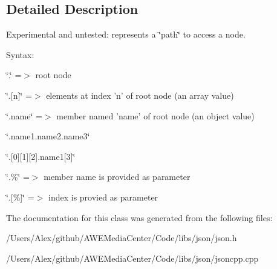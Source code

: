\subsection{Detailed Description}
Experimental and untested\-: represents a \char`\"{}path\char`\"{} to access a node. 

Syntax\-:
\begin{DoxyItemize}
\item \char`\"{}.\char`\"{} =$>$ root node
\item \char`\"{}.\mbox{[}n\mbox{]}\char`\"{} =$>$ elements at index 'n' of root node (an array value)
\item \char`\"{}.\-name\char`\"{} =$>$ member named 'name' of root node (an object value)
\item \char`\"{}.\-name1.\-name2.\-name3\char`\"{}
\item \char`\"{}.\mbox{[}0\mbox{]}\mbox{[}1\mbox{]}\mbox{[}2\mbox{]}.\-name1\mbox{[}3\mbox{]}\char`\"{}
\item \char`\"{}.\%\char`\"{} =$>$ member name is provided as parameter
\item \char`\"{}.\mbox{[}\%\mbox{]}\char`\"{} =$>$ index is provied as parameter 
\end{DoxyItemize}

The documentation for this class was generated from the following files\-:\begin{DoxyCompactItemize}
\item 
/\-Users/\-Alex/github/\-A\-W\-E\-Media\-Center/\-Code/libs/json/json.\-h\item 
/\-Users/\-Alex/github/\-A\-W\-E\-Media\-Center/\-Code/libs/json/jsoncpp.\-cpp\end{DoxyCompactItemize}
